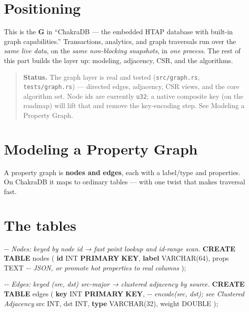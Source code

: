 \documentclass[
  11pt,
  openany]{book}
\newenvironment{Shaded}{}{}
\newcommand{\CommentTok}[1]{\textcolor[rgb]{0.38,0.63,0.69}{\textit{#1}}}
\newcommand{\DataTypeTok}[1]{\textcolor[rgb]{0.56,0.13,0.00}{#1}}
\newcommand{\DecValTok}[1]{\textcolor[rgb]{0.25,0.63,0.44}{#1}}
\newcommand{\KeywordTok}[1]{\textcolor[rgb]{0.00,0.44,0.13}{\textbf{#1}}}
\newcommand{\NormalTok}[1]{#1}
\begin{document}
\section{Positioning}\label{positioning}

This is the \textbf{G} in ``ChakraDB --- the embedded HTAP database with
built-in graph capabilities.'' Transactions, analytics, and graph
traversals run over the \emph{same live data}, on the \emph{same
non-blocking snapshots}, in \emph{one process}. The rest of this part
builds the layer up: modeling, adjacency, CSR, and the algorithms.

\begin{quote}
\textbf{Status.} The graph layer is real and tested
(\texttt{src/graph.rs}, \texttt{tests/graph.rs}) --- directed edges,
adjacency, CSR views, and the core algorithm set. Node ids are currently
\texttt{u32}; a native composite key (on the roadmap) will lift that and
remove the key-encoding step. See Modeling a Property Graph.
\end{quote}

\section{Modeling a Property Graph}\label{modeling-a-property-graph}

A property graph is \textbf{nodes and edges}, each with a label/type and
properties. On ChakraDB it maps to ordinary tables --- with one twist
that makes traversal fast.

\section{The tables}\label{the-tables}

\begin{Shaded}
\begin{Highlighting}[]
\CommentTok{{-}{-} Nodes: keyed by node id → fast point lookup and id{-}range scan.}
\KeywordTok{CREATE} \KeywordTok{TABLE}\NormalTok{ nodes (}
  \KeywordTok{id}     \DataTypeTok{INT} \KeywordTok{PRIMARY} \KeywordTok{KEY}\NormalTok{,}
  \KeywordTok{label}  \DataTypeTok{VARCHAR}\NormalTok{(}\DecValTok{64}\NormalTok{),}
\NormalTok{  props  TEXT               }\CommentTok{{-}{-} JSON, or promote hot properties to real columns}
\NormalTok{);}

\CommentTok{{-}{-} Edges: keyed (src, dst) src{-}major → clustered adjacency by source.}
\KeywordTok{CREATE} \KeywordTok{TABLE}\NormalTok{ edges (}
  \KeywordTok{key}    \DataTypeTok{INT} \KeywordTok{PRIMARY} \KeywordTok{KEY}\NormalTok{,   }\CommentTok{{-}{-} encode(src, dst); see Clustered Adjacency}
\NormalTok{  src    }\DataTypeTok{INT}\NormalTok{,}
\NormalTok{  dst    }\DataTypeTok{INT}\NormalTok{,}
  \KeywordTok{type}   \DataTypeTok{VARCHAR}\NormalTok{(}\DecValTok{32}\NormalTok{),}
\NormalTok{  weight }\DataTypeTok{DOUBLE}
\NormalTok{);}
\end{Highlighting}
\end{Shaded}
\end{document}
